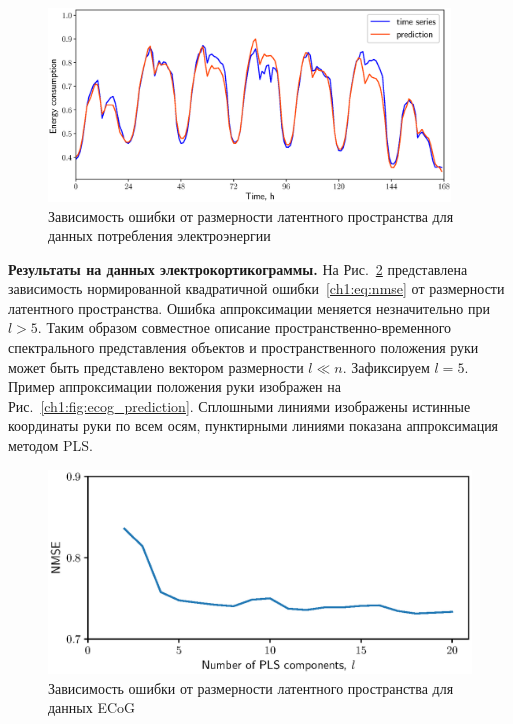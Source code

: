 \begin{figure}[ht]
	\centering
	\includegraphics[width=0.95\textwidth]{figs/ch1/energy_prediction}
	\caption{Зависимость ошибки от размерности латентного пространства для данных потребления электроэнергии}
	\label{ch1:fig:energy_prediction}
\end{figure}

\textbf{Результаты на данных электрокортикограммы.}
На Рис.~\ref{ch1:fig:ecog_n_comp} представлена зависимость нормированной квадратичной ошибки~\eqref{ch1:eq:nmse} от размерности латентного пространства. Ошибка аппроксимации меняется незначительно при $l > 5$.
Таким образом совместное описание пространственно-временного спектрального представления объектов и пространственного положения руки может быть представлено вектором размерности $l \ll n$.
Зафиксируем $l = 5$. 
Пример аппроксимации положения руки изображен на Рис.~\ref{ch1:fig:ecog_prediction}. 
Сплошными линиями изображены истинные координаты руки по всем осям, пунктирными линиями показана аппроксимация методом PLS.
 
\begin{figure}[ht]
	\centering
	\includegraphics[width=0.75\linewidth]{figs/ch1/ecog_n_comp}	
	\caption{Зависимость ошибки от размерности латентного пространства для данных ECoG}
	\label{ch1:fig:ecog_n_comp}
\end{figure}

